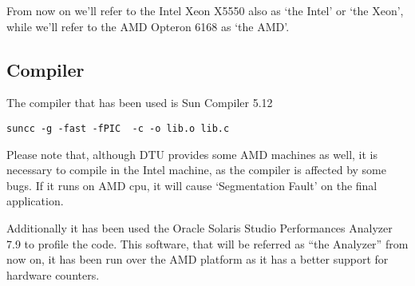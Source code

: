 From now on we’ll refer to the Intel Xeon X5550 also as ‘the Intel’ or ‘the Xeon’, while we’ll refer to the AMD Opteron 6168 as ‘the AMD’.

\subsection{Compiler} 

The compiler that has been used is Sun Compiler 5.12 

\begin{lstlisting}
suncc -g -fast -fPIC  -c -o lib.o lib.c
\end{lstlisting}

Please note that, although DTU provides some AMD machines as well, it is necessary to compile in the Intel machine, as the compiler is affected by some bugs. If it runs on AMD cpu, it will cause ‘Segmentation Fault’ on the final application.

Additionally it has been used the Oracle Solaris Studio Performances Analyzer 7.9 to profile the code. This software, that will be referred as “the Analyzer” from now on, it has been run over the AMD platform as it has a better support for hardware counters.
